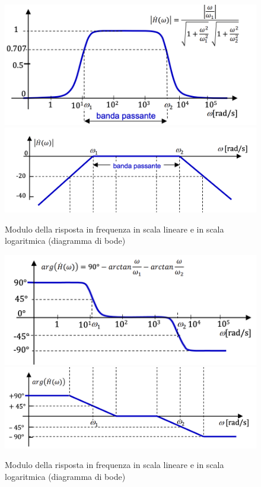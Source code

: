 \documentclass{article}
\theoremstyle{definition}
\begin{document}
\begin{figure}[h]
	\centering 
	\includegraphics[scale=0.35]{immagini/psb}
	\hfil 
	\includegraphics[scale=0.40]{immagini/psbode}
	\caption{Modulo della risposta in frequenza in scala lineare e in scala logaritmica (diagramma di bode)}
\end{figure}
\begin{figure}[h]
	\centering 
	\includegraphics[scale=0.35]{immagini/psb1}
	\hfil 
	\includegraphics[scale=0.35]{immagini/psbode1}
	\caption{Modulo della risposta in frequenza in scala lineare e in scala logaritmica (diagramma di bode)}
\end{figure}
\end{document}
